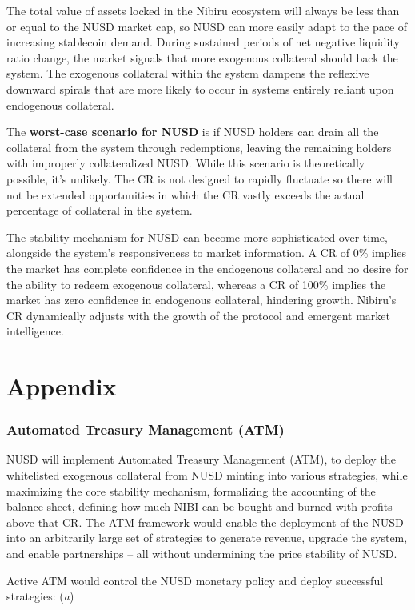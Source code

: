 \documentclass[11pt]{article}
\begin{document}
The total value of assets locked in the Nibiru ecosystem will always be less than or equal to the NUSD market cap, so NUSD can more easily adapt to the pace of increasing stablecoin demand. During sustained periods of net negative liquidity ratio change, the market signals that more exogenous collateral should back the system. The exogenous collateral within the system dampens the reflexive downward spirals that are more likely to occur in systems entirely reliant upon endogenous collateral.

The \textbf{worst-case scenario for NUSD} is if NUSD holders can drain all the collateral from the system through redemptions, leaving the remaining holders with improperly collateralized NUSD. While this scenario is theoretically possible, it’s unlikely. The CR is not designed to rapidly fluctuate so there will not be extended opportunities in which the CR vastly exceeds the actual percentage of collateral in the system.

The stability mechanism for NUSD can become more sophisticated over time, alongside the system’s responsiveness to market information. A CR of 0\% implies the market has complete confidence in the endogenous collateral and no desire for the ability to redeem exogenous collateral, whereas a CR of 100\% implies the market has zero confidence in endogenous collateral, hindering growth. Nibiru’s CR dynamically adjusts with the growth of the protocol and emergent market intelligence.

\part{Appendix}

\section{Automated Treasury Management (ATM)}

NUSD will implement Automated Treasury Management (ATM), to deploy the whitelisted exogenous collateral from NUSD minting into various strategies, while maximizing the core stability mechanism, formalizing the accounting of the balance sheet, defining how much NIBI can be bought and burned with profits above that CR. The ATM framework would enable the deployment of the NUSD into an arbitrarily large set of strategies to generate revenue, upgrade the system, and enable partnerships – all without undermining the price stability of NUSD. 

Active ATM would control the NUSD monetary policy and deploy successful strategies: (\textit{a}) 
\end{document}
